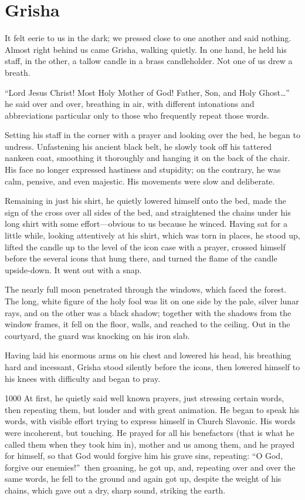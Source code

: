 \chapter{Grisha} %

It felt eerie to us in the dark; we pressed close to one another and said nothing. Almost right behind us came Grisha, walking quietly. In one hand, he held his staff, in the other, a tallow candle in a brass candleholder. Not one of us drew a breath.

``Lord Jesus Christ! Most Holy Mother of God! Father, Son, and Holy Ghost\ldots{}'' he said over and over, breathing in air, with different intonations and abbreviations particular only to those who frequently repeat those words.

Setting his staff in the corner with a prayer and looking over the bed, he began to undress. Unfastening his ancient black belt, he slowly took off his tattered nankeen coat, smoothing it thoroughly and hanging it on the back of the chair. His face no longer expressed hastiness and stupidity; on the contrary, he was calm, pensive, and even majestic. His movements were slow and deliberate.

Remaining in just his shirt, he quietly lowered himself onto the bed, made the sign of the cross over all sides of the bed, and straightened the chains under his long shirt with some effort---obvious to us because he winced. Having sat for a little while, looking attentively at his shirt, which was torn in places, he stood up, lifted the candle up to the level of the icon case with a prayer, crossed himself before the several icons that hung there, and turned the flame of the candle upside-down. It went out with a snap.

The nearly full moon penetrated through the windows, which faced the forest. The long, white figure of the holy fool was lit on one side by the pale, silver lunar rays, and on the other was a black shadow; together with the shadows from the window frames, it fell on the floor, walls, and reached to the ceiling. Out in the courtyard, the guard was knocking on his iron slab.

Having laid his enormous arms on his chest and lowered his head, his breathing hard and incessant, Grisha stood silently before the icons, then lowered himself to his knees with difficulty and began to pray.

\begin{tolerant}{1000}
At first, he quietly said well known prayers, just stressing certain words, then repeating them, but louder and with great animation. He began to speak his words, with visible effort trying to express himself in Church Slavonic. His words were incoherent, but touching. He prayed for all his benefactors (that is what he called them when they took him in), mother and us among them, and he prayed for himself, so that God would forgive him his grave sins, repeating: ``O God, forgive our enemies!''~then groaning, he got up, and, repeating over and over the same words, he fell to the ground and again got up, despite the weight of his chains, which gave out a dry, sharp sound, striking the earth.
\end{tolerant}

